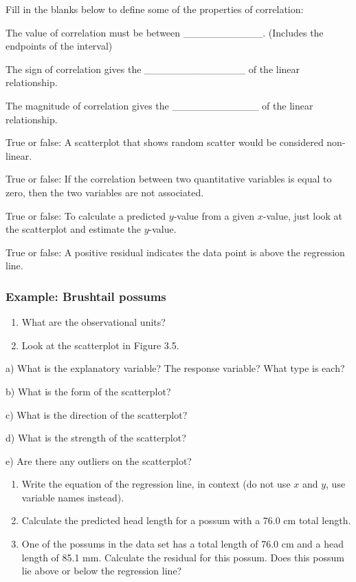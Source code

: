 \documentclass[
]{report}
\newcommand{\rgs}{\vspace{12pt}} %
\newcommand{\rgi}{\hspace{24pt}}  %
\begin{document}
Fill in the blanks below to define some of the properties of correlation:

\rgi The value of correlation must be between \_\_\_\_\_\_\_\_\_\_\_. (Includes the endpoints of the interval)

\rgi The sign of correlation gives the \_\_\_\_\_\_\_\_\_\_\_\_\_\_ of the linear relationship.

\rgi The magnitude of correlation gives the \_\_\_\_\_\_\_\_\_\_\_\_ of the linear relationship.

True or false: A scatterplot that shows random scatter would be considered non-linear.

True or false: If the correlation between two quantitative variables is equal to zero, then the two variables are not associated.

True or false: To calculate a predicted \(y\)-value from a given \(x\)-value, just look at the scatterplot and estimate the \(y\)-value.

True or false: A positive residual indicates the data point is above the regression line.

\hypertarget{example-brushtail-possums}{%
\subsubsection*{Example: Brushtail possums}\label{example-brushtail-possums}}

\begin{enumerate}
\def\labelenumi{\arabic{enumi}.}
\item
  What are the observational units?\\
  \rgs
\item
  Look at the scatterplot in Figure 3.5.
\end{enumerate}

\rgi a) What is the explanatory variable? The response variable? What type is each?
\rgs

\rgi b) What is the form of the scatterplot?
\rgs

\rgi c) What is the direction of the scatterplot?
\rgs

\rgi d) What is the strength of the scatterplot?
\rgs

\rgi e) Are there any outliers on the scatterplot?
\rgs

\begin{enumerate}
\def\labelenumi{\arabic{enumi}.}
\setcounter{enumi}{2}
\item
  Write the equation of the regression line, in context (do not use \(x\) and \(y\), use variable names instead).
  \rgs
\item
  Calculate the predicted head length for a possum with a 76.0 cm total length.
  \rgs
\item
  One of the possums in the data set has a total length of 76.0 cm and a head length of 85.1 mm. Calculate the residual for this possum. Does this possum lie above or below the regression line?
  \rgs
\end{enumerate}
\end{document}

